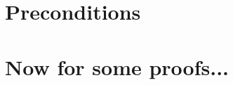 \documentclass[11pt]{amsart}
\begin{document}
%
%

\section{Preconditions}

\section{Now for some proofs...}
\end{document}
